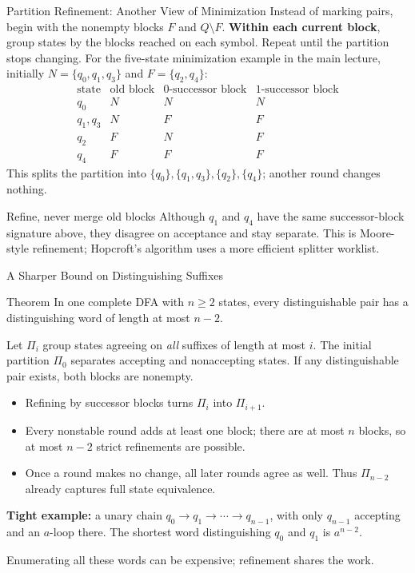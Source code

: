 \documentclass[10pt]{beamer}
\begin{document}
\begin{frame}{Partition Refinement: Another View of Minimization}
  \small
  Instead of marking pairs, begin with the nonempty blocks $F$ and $Q\setminus F$.
  \textbf{Within each current block}, group states by the blocks reached
  on each symbol. Repeat until the partition stops changing.
  \pause
  For the five-state minimization example in the main lecture, initially
  $N=\{q_0,q_1,q_3\}$ and $F=\{q_2,q_4\}$:
  \[
    \begin{array}{c|c|cc}
      \text{state}&\text{old block}&0\text{-successor block}&1\text{-successor block}\\\hline
      q_0&N&N&N\\
      q_1,q_3&N&F&F\\
      q_2&F&N&F\\
      q_4&F&F&F
    \end{array}
  \]
  This splits the partition into
  $\{q_0\},\{q_1,q_3\},\{q_2\},\{q_4\}$; another round changes nothing.
  \pause
  \begin{alertblock}{Refine, never merge old blocks}
    Although $q_1$ and $q_4$ have the same successor-block signature above,
    they disagree on acceptance and stay separate. This is Moore-style
    refinement; Hopcroft's algorithm uses a more efficient splitter worklist.
  \end{alertblock}
\end{frame}

\begin{frame}{A Sharper Bound on Distinguishing Suffixes}
  \small
  \begin{block}{Theorem}
    In one complete DFA with $n\ge2$ states, every distinguishable pair
    has a distinguishing word of length at most $n-2$.
  \end{block}
  \pause
  Let $\Pi_i$ group states agreeing on \emph{all} suffixes of length at most $i$.
  The initial partition $\Pi_0$ separates accepting and nonaccepting states.
  If any distinguishable pair exists, both blocks are nonempty.
  \begin{itemize}
    \item Refining by successor blocks turns $\Pi_i$ into $\Pi_{i+1}$.
    \item Every nonstable round adds at least one block; there are at most
      $n$ blocks, so at most $n-2$ strict refinements are possible.
    \item Once a round makes no change, all later rounds agree as well.
      Thus $\Pi_{n-2}$ already captures full state equivalence.
  \end{itemize}
  \pause
  \textbf{Tight example:} a unary chain $q_0\to q_1\to\cdots\to q_{n-1}$,
  with only $q_{n-1}$ accepting and an $a$-loop there. The shortest word
  distinguishing $q_0$ and $q_1$ is $a^{n-2}$.
  \par\smallskip
  Enumerating all these words can be expensive; refinement shares the work.
\end{frame}
\end{document}
